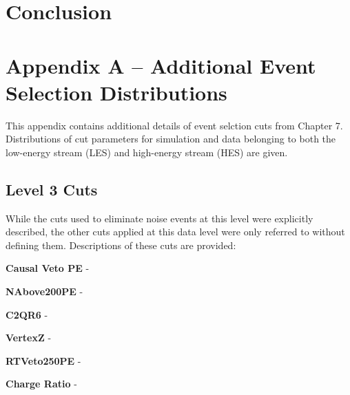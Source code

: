 \documentclass{gatech-thesis}
\begin{document}
\chapter{Conclusion}

\appendix
\chapter{Appendix A -- Additional Event Selection Distributions}
This appendix contains additional details of event selction cuts from Chapter 7. Distributions of cut parameters for simulation and data belonging to both the low-energy stream (LES) and high-energy stream (HES) are given.

\section{Level 3 Cuts}
While the cuts used to eliminate noise events at this level were explicitly described, the other cuts applied at this data level were only referred to without defining them. Descriptions of these cuts are provided:
\begin{adjustwidth}{2.5em}{2.5em}
\setlength{\parindent}{0pt}
\textbf{Causal Veto PE} - 

\textbf{NAbove200PE} - 

\textbf{C2QR6} -

\textbf{VertexZ} -

\textbf{RTVeto250PE} -

\textbf{Charge Ratio} -

\end{adjustwidth}
\setlength{\parindent}{17.5pt}
\end{document}

